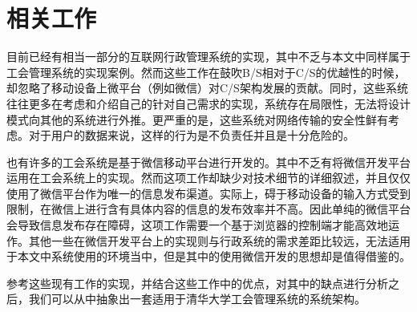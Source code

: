 \chapter{相关工作}

目前已经有相当一部分的互联网行政管理系统的实现\cite{oyj2006}\cite{zw2015}\cite{ysy2000}\cite{wq2010}\cite{sj2004}\cite{hk2013}，其中不乏与本文中同样属于工会管理系统的实现案例\cite{hzj2007}\cite{whx2006}\cite{dxl2007}\cite{lzq2010}。然而这些工作\cite{wq2010}\cite{hzj2007}在鼓吹B/S相对于C/S的优越性的时候，却忽略了移动设备上微平台（例如微信）对C/S架构发展的贡献。同时，这些系统往往更多在考虑和介绍自己的针对自己需求的实现，系统存在局限性，无法将设计模式向其他的系统进行外推。更严重的是，这些系统对网络传输的安全性鲜有考虑。对于用户的数据来说，这样的行为是不负责任并且是十分危险的。

也有许多的工会系统是基于微信移动平台进行开发的。其中不乏有将微信开发平台运用在工会系统上的实现\cite{lih2015}。然而这项工作却缺少对技术细节的详细叙述，并且仅仅使用了微信平台作为唯一的信息发布渠道。实际上，碍于移动设备的输入方式受到限制，在微信上进行含有具体内容的信息的发布效率并不高。因此单纯的微信平台会导致信息发布存在障碍，这项工作需要一个基于浏览器的控制端才能高效地运作。其他一些在微信开发平台上的实现\cite{fanfl2013}\cite{qinjj2015}则与行政系统的需求差距比较远，无法适用于本文中系统使用的环境当中，但是其中的使用微信开发的思想却是值得借鉴的。

参考这些现有工作的实现，并结合这些工作中的优点，对其中的缺点进行分析之后，我们可以从中抽象出一套适用于清华大学工会管理系统的系统架构。

